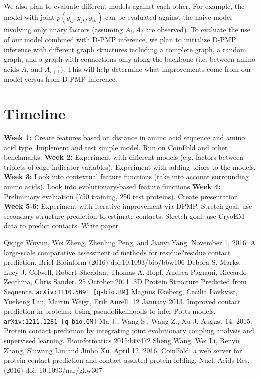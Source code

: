 \documentclass{article}
\begin{document}
We also plan to evaluate different models against each other. For example, the model with joint $p(y_{ij}, y_{jk}, y_{ik})$ can be evaluated against the naive model involving only unary factors (assuming $A_i, A_j$ are observed). To evaluate the use of our model combined with D-PMP inference, we plan to initialize D-PMP inference with different graph structures including a complete graph, a random graph, and a graph with connections only along the backbone (i.e. between amino acids $A_i$ and $A_{i+1}$). This will help determine what improvements come from our model versus from D-PMP inference. 

\section{Timeline}
\textbf{Week 1:} Create features based on distance in amino acid sequence and amino acid type. Implement and test simple model. Run on CoinFold and other benchmarks.
\textbf{Week 2:} Experiment with different models (e.g. factors between triplets of edge indicator variables). Experiment with adding priors to the models.
\textbf{Week 3:} Look into contextual feature functions (take into account surrounding amino acids). Look into evolutionary-based feature functions
\textbf{Week 4:} Preliminary evaluation (750 training, 250 test proteins). Create presentation.
\textbf{Week 5-6:} Experiment with iterative improvement via DPMP. Stretch goal: use secondary structure prediction to estimate contacts. Stretch goal: use CryoEM data to predict contacts. Write paper.

\begin{thebibliography}{9}
{\setlength\itemsep{0.0em}
	Qiqige Wuyun, Wei Zheng, Zhenling Peng, and Jianyi Yang. November 1, 2016. A large-scale comparative assessment of methods for residue?residue contact prediction. Brief Bioinform (2016) doi:10.1093/bib/bbw106
	Debora S. Marks, Lucy J. Colwell, Robert Sheridan, Thomas A. Hopf, Andrea Pagnani, Riccardo Zecchina, Chris Sander. 25 October 2011. 3D Protein Structure Predicted from Sequence. {\tt arXiv:1110.5091 [q-bio.BM]}
	Magnus Ekeberg, Cecilia L{\"o}vkvist, Yueheng Lan, Martin Weigt, Erik Aurell. 12 January 2013. Improved contact prediction in proteins: Using pseudolikelihoods to infer Potts models. {\tt arXiv:1211.1281 [q-bio.QM]}
	 Ma J., Wang S., Wang Z., Xu J. August 14, 2015. Protein contact prediction by integrating joint evolutionary coupling analysis and supervised learning. Bioinformatics 2015:btv472
	Sheng Wang,  Wei Li, Renyu Zhang, Shiwang Liu and Jinbo Xu. April 12, 2016. CoinFold: a web server for protein contact prediction and contact-assisted protein folding. Nucl. Acids Res. (2016) doi: 10.1093/nar/gkw307
}
\end{thebibliography}
\end{document}
